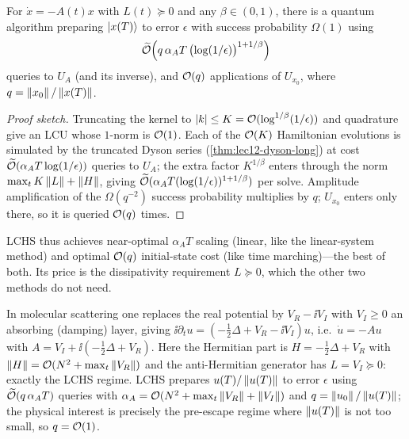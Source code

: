 \begin{theorem}
\label{thm:lec13-lchs-cost}
For $\dot x=-A(t)x$ with $L(t)\succeq0$ and any $\beta\in(0,1)$, there is a quantum algorithm
preparing $\ket{x(T)}$ to error $\epsilon$ with success probability $\Omega(1)$ using
\begin{equation}
  \widetilde{\mathcal{O}}\Bigl(q\,\alpha_A T\,\bigl(\log(1/\epsilon)\bigr)^{1+1/\beta}\Bigr)
  \label{eq:lec13-lchs-cost}
\end{equation}
queries to $U_A$ (and its inverse), and $\mathcal{O}(q)$ applications of $U_{x_0}$, where
$q=\left\lVert x_0 \right\rVert/\left\lVert x(T) \right\rVert$.
\end{theorem}

\begin{proof}[Proof sketch]
Truncating the kernel to $\left\lvert k \right\rvert\le K=\mathcal{O}(\log^{1/\beta}(1/\epsilon))$ and quadrature give an
LCU whose $1$-norm is $\mathcal{O}(1)$. Each of the $\mathcal{O}(K)$ Hamiltonian evolutions is simulated by
the truncated Dyson series (\cref{thm:lec12-dyson-long}) at cost $\widetilde{\mathcal{O}}(\alpha_A T
\log(1/\epsilon))$ queries to $U_A$; the extra factor $K^{1/\beta}$ enters through the norm
$\max_t K\left\lVert L \right\rVert+\left\lVert H \right\rVert$, giving $\widetilde{\mathcal{O}}(\alpha_A T(\log(1/\epsilon))^{1+1/\beta})$
per solve. Amplitude amplification of the $\Omega(q^{-2})$ success probability multiplies by $q$;
$U_{x_0}$ enters only there, so it is queried $\mathcal{O}(q)$ times.
\end{proof}

LCHS thus achieves near-optimal $\alpha_A T$ scaling (linear, like the linear-system method) and
optimal $\mathcal{O}(q)$ initial-state cost (like time marching)---the best of both. Its price is the
dissipativity requirement $L\succeq0$, which the other two methods do not need.

\begin{example}
\label{exa:lec13-cap}
In molecular scattering one replaces the real potential by $V_R-\ii V_I$ with $V_I\ge0$ an
absorbing (damping) layer, giving $\ii\partial_t u=(-\tfrac12\Delta+V_R-\ii V_I)u$, i.e.\
$\dot u=-A u$ with $A=V_I+\ii(-\tfrac12\Delta+V_R)$. Here the Hermitian part is
$H=-\tfrac12\Delta+V_R$ with $\left\lVert H \right\rVert=\mathcal{O}(N^2+\max_t\left\lVert V_R \right\rVert)$ and the anti-Hermitian
generator has $L=V_I\succeq0$: exactly the LCHS regime. LCHS prepares $u(T)/\left\lVert u(T) \right\rVert$ to
error $\epsilon$ using $\widetilde{\mathcal{O}}(q\,\alpha_A T)$ queries with
$\alpha_A=\mathcal{O}(N^2+\max_t\left\lVert V_R \right\rVert+\left\lVert V_I \right\rVert)$ and $q=\left\lVert u_0 \right\rVert/\left\lVert u(T) \right\rVert$; the physical
interest is precisely the pre-escape regime where $\left\lVert u(T) \right\rVert$ is not too small, so $q=\mathcal{O}(1)$.
\end{example}


